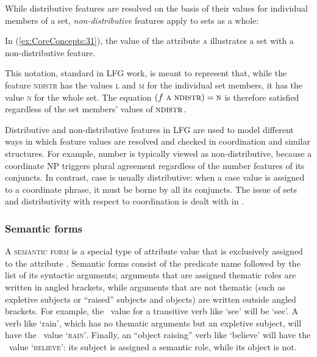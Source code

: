 \documentclass[output=paper,hidelinks]{langscibook}
\begin{document}
 While distributive features are resolved on the basis of their values for individual members of a set, \textit{non-distributive} features apply to sets as a whole:
 
 \eas
 \zs
In (\ref{ex:CoreConcepts:31}),  the value of the attribute \textsc{a} illustrates a set with a non-distributive feature.  
 
 \begin{exe}\label{ex:CoreConcepts:31}
 \ex{}
 \end{exe}
This notation, standard in LFG work, is meant to represent that, while the feature \textsc{ndistr} has the values \textsc{l} and \textsc{m} for the individual set members, it has the value \textsc{n} for the whole set. The equation $(f~\textsc{a}~\textsc{ndistr}) = \textsc{n}$ is therefore satisfied regardless of the set members' values of $\textsc{ndistr}$.
 
 Distributive and non-distributive features in LFG are used to model different ways in which feature values are resolved and checked in coordination and similar structures. For example, number is typically viewed as non-distributive, because a coordinate NP triggers plural agreement regardless of the number features of its conjuncts. In contrast, case is usually distributive: when a case value is assigned to a coordinate phrase, it must be borne by all its conjuncts. The issue of sets and distributivity with respect to coordination is dealt with in .
 
\subsubsection{Semantic forms\label{sect:pred}}
 
 A \textsc{semantic form} is a special type of attribute value that is exclusively assigned to the attribute \PRED. Semantic forms consist of the predicate name followed by the list of its syntactic arguments; arguments that are assigned thematic roles are written in angled brackets, while arguments that are not thematic (such as expletive subjects or ``raised'' subjects and objects) are written outside angled brackets. For example, the \PRED\ value for a transitive verb like `see' will be `see\arglist{\SUBJ \OBJ}'. A verb like `rain', which has no thematic arguments but an expletive subject, will have the \PRED\ value \textsc{`rain\arglist{\/}\SUBJ'}. Finally, an ``object raising'' verb like `believe' will have the \PRED\ value \textsc{`believe\arglist{\SUBJ}\OBJ'}: its subject is assigned a semantic role, while its object is not.
 
\end{document}
